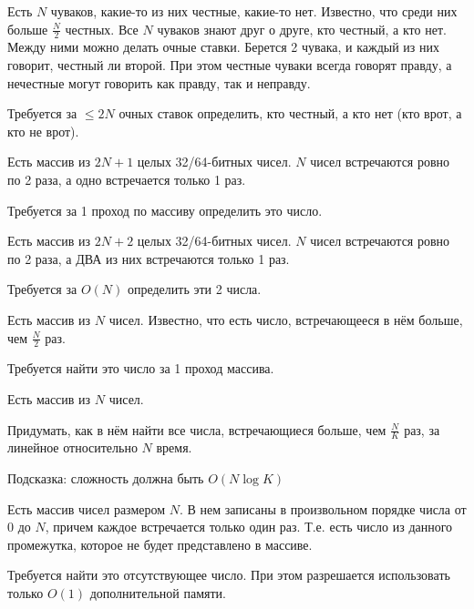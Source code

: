 \begin{problem}
Есть $N$ чуваков, какие-то из них честные, какие-то нет. Известно, что среди них больше $\frac{N}{2}$ честных. Все $N$ чуваков знают друг о друге, кто честный, а кто нет.
Между ними можно делать очные ставки. Берется 2 чувака, и каждый из них говорит, честный ли второй. При этом честные чуваки всегда говорят правду, а нечестные могут говорить как правду, так и неправду.

Требуется за $\leq 2N$ очных ставок определить, кто честный, а кто нет (кто врот, а кто не врот).

\end{problem}
\begin{problem}

Есть массив из $2N + 1$ целых 32/64-битных чисел. $N$ чисел встречаются ровно по 2
раза, а одно встречается только 1 раз.

Требуется за 1 проход по массиву определить это число.

\end{problem}
\begin{problem}

Есть массив из $2N + 2$ целых 32/64-битных чисел. $N$ чисел встречаются ровно по 2
раза, а ДВА из них встречаются только 1 раз.

Требуется за $O(N)$ определить эти 2 числа.

\end{problem}
\begin{problem}

Есть массив из $N$ чисел. Известно, что есть число, встречающееся в нём больше, чем $\frac{N}{2}$ раз.

Требуется найти это число за 1 проход массива.

\end{problem}
\begin{problem}

Есть массив из $N$ чисел.

Придумать, как в нём найти все числа, встречающиеся больше, чем $\frac{N}{K}$ раз, за линейное относительно $N$ время.

Подсказка: сложность должна быть $O(N\log{K})$

\end{problem}
\begin{problem}

Есть массив чисел размером $N$. В нем записаны в произвольном порядке числа от $0$ до $N$, причем каждое встречается только один раз. Т.е. есть число из данного промежутка, которое не будет представлено в массиве.

Требуется найти это отсутствующее число. При этом разрешается использовать только $O(1)$ дополнительной памяти.

\end{problem}
